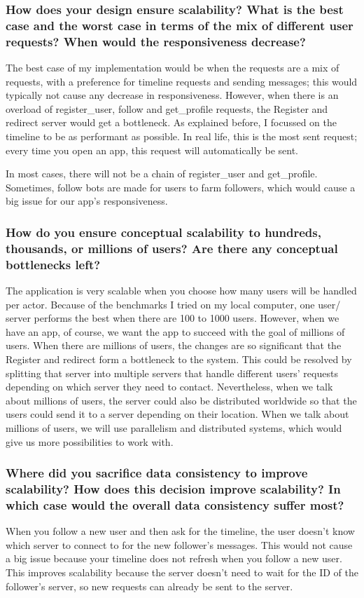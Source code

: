 \documentclass[a4paper]{article}
\begin{document}
\subsubsection{How does your design ensure scalability? What is the best case and the worst case in
terms of the mix of different user requests? When would the responsiveness decrease?}
The best case of my implementation would be when the requests are a mix of requests, with a preference for timeline requests and sending messages; this would typically not cause any decrease in responsiveness. However, when there is an overload of register\_user, follow and get\_profile requests, the Register and redirect server would get a bottleneck. As explained before, I focussed on the timeline to be as performant as possible. In real life, this is the most sent request; every time you open an app, this request will automatically be sent.

In most cases, there will not be a chain of register\_user and get\_profile. Sometimes, follow bots are made for users to farm followers, which would cause a big issue for our app's responsiveness. \subsubsection{How do you ensure conceptual scalability to hundreds, thousands, or millions of users?
Are there any conceptual bottlenecks left?}

The application is very scalable when you choose how many users will be handled per actor. Because of the benchmarks I tried on my local computer, one user/ server performs the best when there are 100 to 1000 users. However, when we have an app, of course, we want the app to succeed with the goal of millions of users. When there are millions of users, the changes are so significant that the Register and redirect form a bottleneck to the system. This could be resolved by splitting that server into multiple servers that handle different users' requests depending on which server they need to contact. Nevertheless, when we talk about millions of users, the server could also be distributed worldwide so that the users could send it to a server depending on their location. When we talk about millions of users, we will use parallelism and distributed systems, which would give us more possibilities to work with.

\subsubsection{ Where did you sacrifice data consistency to improve scalability? How does this decision improve scalability? In which case would the overall data consistency suffer most? }
When you follow a new user and then ask for the timeline, the user doesn't know which server to connect to for the new follower's messages. This would not cause a big issue because your timeline does not refresh when you follow a new user. This improves scalability because the server doesn't need to wait for the ID of the follower's server, so new requests can already be sent to the server. 
\end{document}

